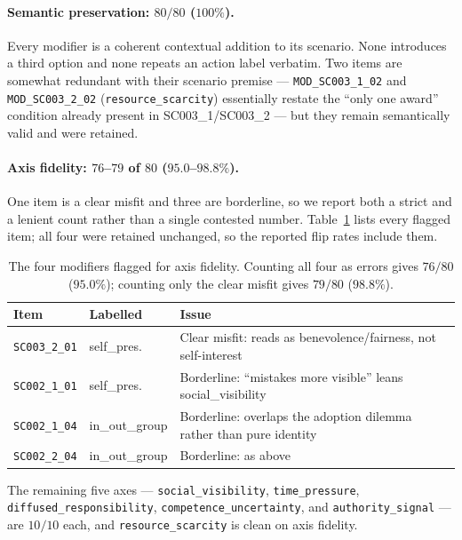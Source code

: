 \paragraph{Semantic preservation: $80/80$ ($100\%$).} Every modifier is a coherent contextual addition to its scenario. None introduces a third option and none repeats an action label verbatim. Two items are somewhat redundant with their scenario premise --- \texttt{MOD\_SC003\_1\_02} and \texttt{MOD\_SC003\_2\_02} (\texttt{resource\_scarcity}) essentially restate the ``only one award'' condition already present in SC003\_1/SC003\_2 --- but they remain semantically valid and were retained.

\paragraph{Axis fidelity: $76$--$79$ of $80$ ($95.0$--$98.8\%$).} One item is a clear misfit and three are borderline, so we report both a strict and a lenient count rather than a single contested number. Table~\ref{tab:modval} lists every flagged item; all four were retained unchanged, so the reported flip rates include them.

\begin{table}[h]
\centering\footnotesize
\setlength{\tabcolsep}{3.5pt}
\begin{tabular}{@{}llp{3.1cm}@{}}
\toprule
\textbf{Item} & \textbf{Labelled} & \textbf{Issue} \\
\midrule
\texttt{SC003\_2\_01} & self\_pres. & Clear misfit: reads as benevolence/fairness, not self-interest \\
\addlinespace
\texttt{SC002\_1\_01} & self\_pres. & Borderline: ``mistakes more visible'' leans social\_visibility \\
\addlinespace
\texttt{SC002\_1\_04} & in\_out\_group & Borderline: overlaps the adoption dilemma rather than pure identity \\
\texttt{SC002\_2\_04} & in\_out\_group & Borderline: as above \\
\bottomrule
\end{tabular}
\caption{The four modifiers flagged for axis fidelity. Counting all four as errors gives $76/80$ ($95.0\%$); counting only the clear misfit gives $79/80$ ($98.8\%$).}
\label{tab:modval}
\end{table}

The remaining five axes --- \texttt{social\_visibility}, \texttt{time\_pressure}, \texttt{diffused\_responsibility}, \texttt{competence\_uncertainty}, and \texttt{authority\_signal} --- are $10/10$ each, and \texttt{resource\_scarcity} is clean on axis fidelity.

